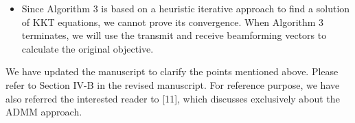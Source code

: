\begin{enumerate}
\begin{itemize}
\item Since Algorithm 3 is based on a heuristic iterative approach to find a solution of \ac{KKT} equations, we cannot prove its convergence. When Algorithm 3 terminates, we will use the transmit and receive beamforming vectors to calculate the original objective.

\end{itemize}

We have updated the manuscript to clarify the points mentioned above. Please refer to Section IV-B in the revised manuscript. For reference purpose, we have also referred the interested reader to [11], which discusses exclusively about the ADMM approach.

\begin{comment}
\resp We thank the reviewer for raising the concern regarding the convergence of the distributed algorithms with limited number of iterations. In view of this, we have updated the manuscript to include discussions on the convergence of the distributed algorithms with a limited number of iterations in the third paragraph of Appendix B after (57). Since the monotonicity of the algorithm with limited number of updates in each subproblem is not guaranteed in each iteration, it is hard to prove the convergence of the overall algorithm. However, if the algorithm is allowed to converge or iterated enough to guarantee the strict monotonicity of the objective in between the \ac{SCA} updates, the global convergence of the algorithm to a limit point of the original nonconvex problem is guaranteed based on the discussions provided in Appendix A.
\begin{itemize}
\item If there exists a fixed point or a set of fixed points for the original nonconvex problem in (16), then the proposed centralized algorithm in Section III-B and III-C finds at least one such point if iterated until convergence, which is provided in Appendix A. In order to find a unique fixed point, we regularize the objective function in (16) with a quadratic penalty term as discussed in Appendix A to transform the objective as a strongly convex function.
\item If the distributed algorithm is carried out for a limited number of iterations, it is not guaranteed to achieve a fixed point even if the outer \ac{SCA} update is performed for a large number of iterations. By this approach, the distributed approaches are not guaranteed to converge to a stationary point. In all our simulations on the primal and the \ac{ADMM} approach, we have set \eqn{J_{\max} = 20} in order to guarantee the monotonicity of the objective.

\end{comment}
\end{enumerate}
